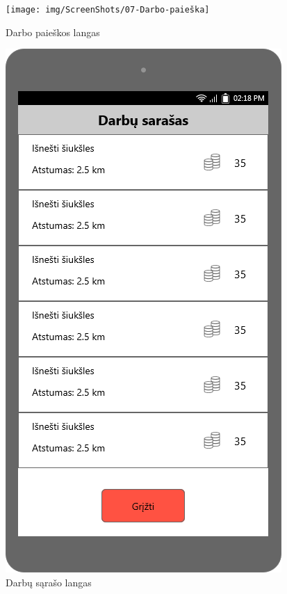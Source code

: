 \documentclass{VUMIFPSbakalaurinis}
\begin{document}
\begin{figure}[H]
	\centering
	\texttt{[image: img/ScreenShots/07-Darbo-paieška]}
	\caption{Darbo paieškos langas}
	\label{img:find work}
\end{figure}

\begin{figure}[H]
	\centering
	\includegraphics[scale=0.4]{img/ScreenShots/09-Darbų-sąrašas}
	\caption{Darbų sąrašo langas}
	\label{img:work list}
\end{figure}
\end{document}
